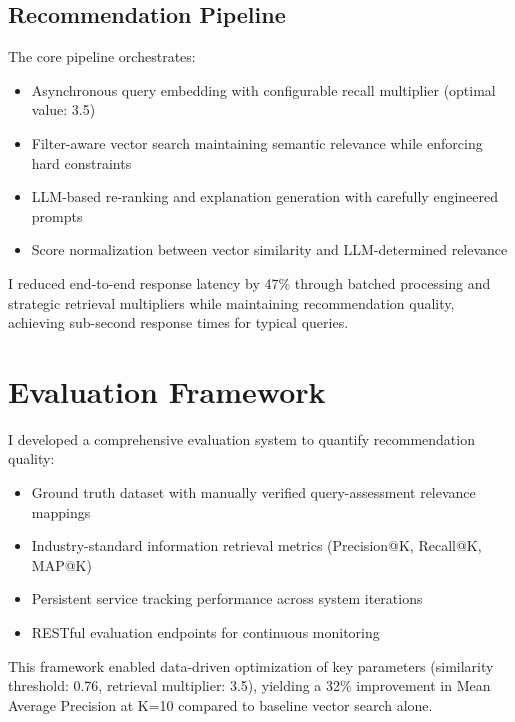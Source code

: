 \documentclass[10pt,a4paper,twocolumn]{article}
\begin{document}
\subsection{Recommendation Pipeline}
\small
The core pipeline orchestrates:
\begin{itemize}[leftmargin=*,itemsep=2pt,topsep=0pt,parsep=0pt]
    \item Asynchronous query embedding with configurable recall multiplier (optimal value: 3.5)
    \item Filter-aware vector search maintaining semantic relevance while enforcing hard constraints
    \item LLM-based re-ranking and explanation generation with carefully engineered prompts
    \item Score normalization between vector similarity and LLM-determined relevance
\end{itemize}

I reduced end-to-end response latency by 47\% through batched processing and strategic retrieval multipliers while maintaining recommendation quality, achieving sub-second response times for typical queries.

\section{Evaluation Framework}
\small
I developed a comprehensive evaluation system to quantify recommendation quality:
\begin{itemize}[leftmargin=*,itemsep=2pt,topsep=0pt,parsep=0pt]
    \item Ground truth dataset with manually verified query-assessment relevance mappings
    \item Industry-standard information retrieval metrics (Precision@K, Recall@K, MAP@K)
    \item Persistent service tracking performance across system iterations
    \item RESTful evaluation endpoints for continuous monitoring
\end{itemize}

This framework enabled data-driven optimization of key parameters (similarity threshold: 0.76, retrieval multiplier: 3.5), yielding a 32\% improvement in Mean Average Precision at K=10 compared to baseline vector search alone.
\end{document}
